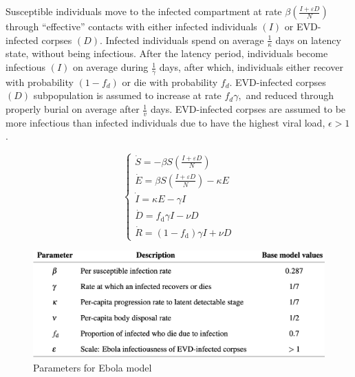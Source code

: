 \documentclass{book}
\begin{document}
Susceptible individuals move to the infected compartment at rate $\beta\left(\frac{I+\varepsilon D}{N}\right)$ through ``effective'' contacts with either infected individuals $(I)$ or EVD-infected corpses $(D)$. Infected individuals spend on average $\frac{1}{\kappa}$ days on latency state, without being infectious. After the latency period, individuals become infectious $(I)$
on average during $\frac{1}{\gamma}$ days, after which, individuals either recover with probability $\left(1-f_{d}\right)$ or die with probability $f_{d}$. EVD-infected corpses $(D)$ subpopulation is assumed to increase at rate $f_{d} \gamma,$ and reduced through properly burial on average after $\frac{1}{v}$ days. EVD-infected corpses are assumed to be more infectious than infected individuals due to have the highest viral load, $\epsilon>1$.

\begin{equation} \label{eq:ebola_model}
\left\{\begin{array}{l}
\dot{S}=-\beta S\left(\frac{I+\varepsilon D}{N}\right) \\
\dot{E}=\beta S\left(\frac{I+\varepsilon D}{N}\right)-\kappa E \\
\dot{I}=\kappa E-\gamma I \\
\dot{D}=f_{\mathrm{d}} \gamma I-\nu D \\
\dot{R}=\left(1-f_{\mathrm{d}}\right) \gamma I+\nu D
\end{array}\right.
\end{equation}

%
\begin{figure}[H]
    \centering
    \includegraphics[scale=0.4]{ebola1}
    \caption{Parameters for Ebola model}
    \label{fig:ebola_params}
\end{figure}
\end{document}
